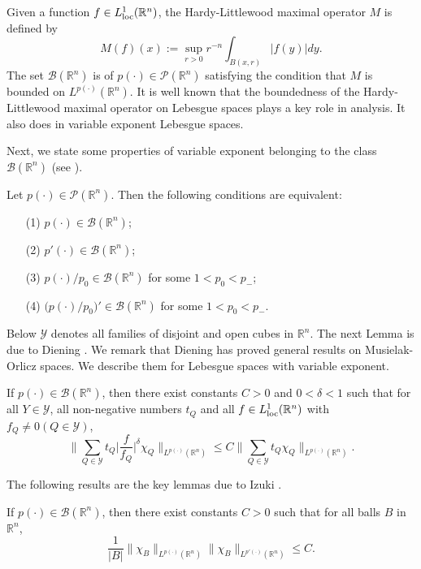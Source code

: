 \documentclass{amse-new}
\numberwithin{equation}{section} %
\begin{document}
Given a function $f\in L^{1}_{\rm loc}(\mathbb{R}^n)$, the Hardy-Littlewood maximal operator $M$ is defined by
$$M(f)(x):=\sup_{r>0}r^{-n}\int_{B(x,r)}|f(y)|dy.$$
The set $\mathcal{B}(\mathbb{R}^n)$ is of $p(\cdot)\in \mathcal{P}(\mathbb{R}^n)$ satisfying the condition that $M$ is bounded on $L^{p(\cdot)}(\mathbb{R}^n)$. It is well known that the boundedness of the Hardy-Littlewood maximal operator on Lebesgue spaces plays a key role in analysis. It also does in variable exponent Lebesgue spaces.

Next, we state some properties of variable exponent belonging to the class $\mathcal{B}(\mathbb{R}^n)$ (see \cite{D}).
\begin{lemma}\label{l1}
Let $p(\cdot)\in \mathcal{P}(\mathbb{R}^n)$. Then the following conditions are equivalent:
\begin{enumerate}
\item [\rm(1)] $p(\cdot)\in \mathcal{B}(\mathbb{R}^n)$;
\item [\rm(2)] $p'(\cdot)\in \mathcal{B}(\mathbb{R}^n)$;
\item [\rm(3)] $p(\cdot)/p_{0}\in \mathcal{B}(\mathbb{R}^n)$ for some $1<p_{0}<p_{-}$;
\item [\rm(4)] $\big(p(\cdot)/p_{0}\big)'\in \mathcal{B}(\mathbb{R}^n)$ for some $1<p_{0}<p_{-}$.
\end{enumerate}
\end{lemma}

Below $\mathcal{Y}$ denotes all families of disjoint and open cubes in $\mathbb{R}^n$. The next Lemma is due to Diening \cite[Lemma 5.5]{D}. We remark that Diening has proved general results on Musielak-Orlicz spaces. We describe them for Lebesgue spaces with variable exponent.

\begin{lemma}\label{l2}
If $p(\cdot)\in \mathcal{B}(\mathbb{R}^n)$, then there exist constants $C>0$ and $0<\delta<1$ such that for all $Y\in \mathcal{Y}$, all non-negative numbers $t_{Q}$ and all $f\in L^{1}_{\rm loc}(\mathbb{R}^n)$ with $f_{Q}\neq 0 (Q\in \mathcal{Y})$,
\begin{equation}\label{eq2.1}
\bigg\|\sum_{Q\in \mathcal{Y}}t_{Q}\Big|\frac{f}{f_{Q}}\Big|^{\delta}\chi_{Q}\bigg\|_{L^{p(\cdot)}(\mathbb{R}^n)}\leq C\bigg\|\sum_{Q\in \mathcal{Y}}t_{Q}\chi_{Q}\bigg\|_{L^{p(\cdot)}(\mathbb{R}^n)}.
\end{equation}
\end{lemma}
\vspace{0.3cm}
The following results are the key lemmas due to Izuki \cite{I}.
\begin{lemma}\label{l3}
If $p(\cdot)\in \mathcal{B}(\mathbb{R}^n)$, then there exist constants $C>0$ such that for all balls $B$ in $\mathbb{R}^n$,
\begin{equation}\label{eq2.2}
\frac{1}{|B|}\|\chi_{B}\|_{L^{p(\cdot)}(\mathbb{R}^n)}\|\chi_{B}\|_{L^{p'(\cdot)}(\mathbb{R}^n)}\leq C.
\end{equation}
\end{lemma}
\end{document}
